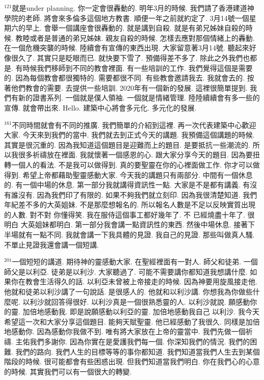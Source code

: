 \documentclass{book}
\begin{document}
$^{121}$就是under planning.
你一定會很轟動的.
明年3月的時候.
我們請了香港建道神學院的老師.
將會來多倫多這個地方教書.
順便一年之前就約定了.
3月14號一個星期六的早上.
會舉一個講座會很轟動的.
就是講到自殺.
就是有弟兄姊妹自殺的時候.
教睦或者是普通的弟兄姊妹.
親友自殺的時候.
怎樣去應對那個情緒上的轟動.
在一個危機突襲的時候.
陸續會有宣傳的東西出現.
大家留意著3月14號.
聽起來好像很久了.
其實只是眨眼而已.
就快要下雪了.
預備得差不多了.
除此之外我們也都是.
有時候我們移師到不同的教會裡面.
有一些培訓的工作.
我們覺得這個是需要的.
因為每個教會都很獨特的.
需要都很不同.
有些教會邀請我去.
我就會去的.
按著他們教會的需要.
去提供一些培訓.
2020年有一個新的發展.
這裡很簡單提到.
我們有新的證書系列.
一個就是僕人領袖.
一個就是情緒管理.
陸陸續續會有多一些的宣傳.
就會帶出來.
Hello.
建築中心將會多元化.
多元化的發展.

$^{161}$不同時間就會有不同的推廣.
我們簡單的介紹到這裡.
再一次代表建築中心歡迎大家.
今天來到我們的當中.
我們就去到正式今天的講題.
我預備這個講題的時候.
其實是很沉重的.
因為我知道這個題目是迎難而上的題目.
是要抵抗一些潮流的.
所以我很多祈禱放在裡面.
我就懷著一個感恩的心.
跟大家分享今天的題目.
因為要扭轉一個人的看法.
不是我可以做得到.
真的要聖靈在你的心裡面做工作.
你才可以做得到.
希望上帝都藉助聖靈感動大家.
今天我的講題只有兩部分.
中間有一個休息的.
有一個中場的休息.
第一部分我就講得資訊性一點.
大家是不是都有講義.
有沒有誰沒有.
因為我們印了有限的.
如果不夠我們就立刻印.
因為我很清楚知道.
我們年紀差不多的大英姐妹.
不是那麼想報名的.
所以報名人數是不足以反映實質出現的人數.
對不對 你懂得笑.
我在服侍這個事工都好幾年了.
不 已經燒盡十年了.
很明白 大英姐妹都明白.
第一部分我會講一點資訊性的東西.
然後中場休息.
接著下半場就有一點不同.
我就會講一下我具體的見證.
我自己的見證.
那些叫做真人騷.
不單止見證我還會講一個短講.

$^{201}$一個短短的講道.
期待神的靈感動大家.
在聖經裡面有一對人.
師父和徒弟.
一個師父是以利亞.
徒弟是以利沙.
大家聽過了.
可能不需要講你都知道我想講什麼.
如果你在教會生活得久的話.
以利亞未曾被上帝接走的時候.
因為神要用旋風接走他.
他就和徒弟以利沙講了一句說話.
是很感人的.
他就和以利沙講.
你想我為你做些什麼呢.
以利沙就回答得很好.
以利沙真是一個很熟悉靈的人.
以利沙就說.
願感動你的靈.
加倍地感動我.
即是說願感動以利亞的靈.
加倍地感動我自己 以利沙.
我今天希望這一次和大家分享這個題目.
能夠天賦聖靈.
他已經感動了我很久.
同樣是加倍地感動你.
因為感動你我做不到.
唯有將大家放在上帝的靈當中.
我們先做一個祈禱.
主佑我們多謝你.
因為你實在是愛護我們每一個.
你深知我們的情況.
我們的困難.
我們的路向.
我們人生的目標等等的事你都知道.
我們知道當我們人生去到某個階段的時候.
很可能都會有些困惑出現.
但我們知道當我們明白.
你在我們心的心意的時候.
其實我們可以有一個很大的轉變.
\end{document}
